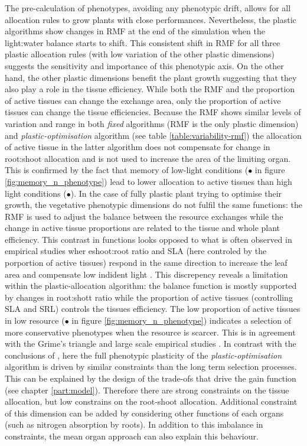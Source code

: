 The pre-calculation of phenotypes, avoiding any phenotypic drift, allows for all allocation rules to grow plants with close performances. Nevertheless, the plastic algorithms show changes in RMF at the end of the simulation when the light:water balance starts to shift. This consistent shift in RMF for all three plastic allocation rules (with low variation of the other plastic dimensions) suggests the sensitivity and importance of this phenotypic axis. On the other hand, the other plastic dimensions benefit the plant growth suggesting that they also play a role in the tissue efficiency. While both the RMF and the proportion of active tissues can change the exchange area, only the proportion of active tissues can change the tissue efficiencies. Because the RMF shows similar levels of variation and range in both \textit{fixed} algorithms (RMF is the only plastic dimension) and \textit{plastic-optimisation} algorithm (see table \ref{table:variability-rmf}) the allocation of active tissue in the latter algorithm does not compensate for change in root:shoot allocation and is not used to increase the area of the limiting organ. This is confirmed by the fact that memory of low-light conditions (\textcolor{myBlue}{$\bullet$} in figure \ref{fig:memory_n_phenotype}) lead to lower allocation to active tissues than high light conditions (\textcolor{myYellow}{$\bullet$}). In the case of fully plastic plant trying to optimise their growth, the vegetative phenotypic dimensions do not fulfil the same functions: the RMF is used to adjust the balance between the resource exchanges while the change in active tissue proportions are related to the tissue and whole plant efficiency. This contrast in functions looks opposed to what is often observed in empirical studies wher eshoot:root ratio and SLA (here controled by the porportion of active tissues) respond in the same direction to increase the leaf area and compensate low indident light \parencite{ryser_consequences_2000, poorter_causes_2009, poorte2_biomass_2012}. This discrepency reveals a limitation within the plastic-allocation algorithm: the balance function is mostly supported by changes in root:shott ratio while the proportion of active tissues (controlling SLA and SRL) controls the tissues efficiency. The low proportion of active tissues in low resource (\textcolor{myRed}{$\bullet$} in figure \ref{fig:memory_n_phenotype}) indicates a selection of more conservative phenotypes when the resource is scarcer. This is in agreement with the Grime's triangle \parencite{grime_evidence_1977} and large scale empirical studies \parencite{wright_worldwide_2004}. In contrast with the conclusions of \cite{ryser_consequences_2000}, here the full phenotypic plasticity of the \textit{plastic-optimisation} algorithm is driven by similar constraints than the long term selection processes. This can be explained by the design of the trade-ofs that drive the gain function (see chapter \ref{part:model}). Therefore there are strong constraints on the tissue allocation, but low constrains on the root-shoot allocation. Additional constraint of this dimension can be added by considering other functions of each organs (such as nitrogen absorption by roots). In addition to this imbalance in constraints, the mean organ approach can also explain this behaviour. 